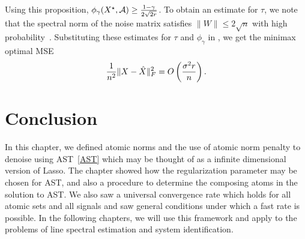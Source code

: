 Using this proposition, $\phi_\gamma(X^\star,\mathcal{A}) \geq
\frac{1-\gamma}{2\sqrt{2r}}$. To obtain an estimate for $\tau$, we note that
the spectral norm of the noise matrix satisfies $\|W\|\leq
2\sqrt{n}$ with high probability~\cite{Davidson01}. Substituting these
estimates for $\tau$ and $\phi_\gamma$ in , we get
the minimax optimal MSE
\begin{align*}
\frac{1}{n^2}\lVert X-\hat{X}\rVert_F^2 = O\left( \frac{\sigma^2 r}{n} \right).
\end{align*}


\section{Conclusion} %
\label{sec:ast:conclusion}
In this chapter, we defined atomic norms and the use of atomic norm penalty to
denoise using AST~\eqref{AST} which may be thought of as a infinite dimensional
version of Lasso. The chapter showed how the regularization parameter may be
chosen for AST, and also a procedure to determine the composing atoms in the
solution to AST. We also saw a universal convergence rate which holds for all
atomic sets and all signals and saw general conditions under which a fast rate
is possible. In the following chapters, we will use this framework and apply to
the problems of line spectral estimation and system identification.
